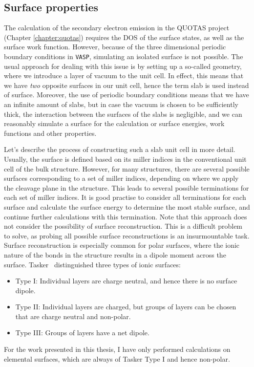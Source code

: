\begin{refsection}
\subsection{Surface properties}\label{automation:sec-surface}

The calculation of the secondary electron emission in the QUOTAS project (Chapter \ref{chapter:quotas}) requires the DOS of the surface states, as well as the surface work function. However, because of the three dimensional periodic boundary conditions in \texttt{VASP}, simulating an isolated surface is not possible. The usual approach for dealing with this issue is by setting up a so-called  geometry, where we introduce a layer of vacuum to the unit cell. In effect, this means that we have \textit{two} opposite surfaces in our unit cell, hence the term slab is used instead of surface. Moreover, the use of periodic boundary conditions means that we have an infinite amount of slabs, but in case the vacuum is chosen to be sufficiently thick, the interaction between the surfaces of the slabs is negligible, and we can reasonably simulate a surface for the calculation or surface energies, work functions and other properties. 

Let's describe the process of constructing such a slab unit cell in more detail. Usually, the surface is defined based on its miller indices in the conventional unit cell of the bulk structure. However, for many structures, there are several possible surfaces corresponding to a set of miller indices, depending on where we apply the cleavage plane in the structure. This leads to several possible terminations for each set of miller indices. It is good practise to consider all terminations for each surface and calculate the surface energy to determine the most stable surface, and continue further calculations with this termination. Note that this approach does not consider the possibility of surface reconstruction. This is a difficult problem to solve, as probing all possible surface reconstructions is an insurmountable task. Surface reconstruction is especially common for polar surfaces, where the ionic nature of the bonds in the structure results in a dipole moment across the surface. Tasker~\cite{Tasker1979} distinguished three types of ionic surfaces:
\begin{itemize}
\item Type I: Individual layers are charge neutral, and hence there is no surface dipole.
\item Type II: Individual layers are charged, but groups of layers can be chosen that are charge neutral and non-polar.
\item Type III: Groups of layers have a net dipole.
\end{itemize}
For the work presented in this thesis, I have only performed calculations on elemental surfaces, which are always of Tasker Type I and hence non-polar.


\end{refsection}
